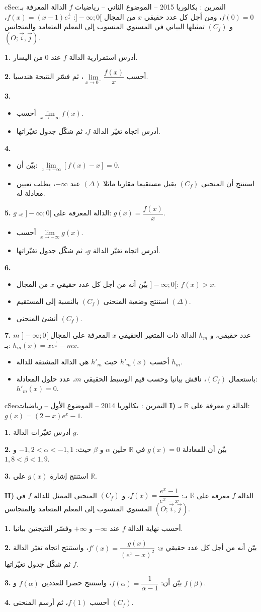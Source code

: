 \documentclass[12pt,a4paper]{article}
\newenvironment{BOX}[2]{\begin{otherlanguage}{english}\begin{arbox}{#1}{#2}}{\end{arbox}\end{otherlanguage}}
\newcounter{exo}
\newenvironment{tamrin}[1]{\stepcounter{exo}\begin{BOX}{cSec}{التمرين \theexo: #1}}{\end{BOX}}
\newcommand{\R}{\mathbb{R}}
\newenvironment{sq}{\begin{itemize}[leftmargin=2.4em,itemsep=3pt]}{\end{itemize}}
\newcommand{\qa}{\item[(أ)]}\newcommand{\qb}{\item[(ب)]}\newcommand{\qc}{\item[(جـ)]}\newcommand{\qd}{\item[(د)]}\newcommand{\qe}{\item[(هـ)]}
\newcommand{\QQ}[1]{\par\smallskip\textbf{#1.} }
\begin{document}
\begin{tamrin}{بكالوريا 2015 -- الموضوع الثاني -- رياضيات}
$f$ الدالة المعرفة بـ: $f(0)=0$، ومن أجل كل عدد حقيقي $x$ من المجال $]{-}\infty;0[$: $f(x)=(x-1)e^{\frac1x}$،
و $(C_f)$ تمثيلها البياني في المستوي المنسوب إلى المعلم المتعامد والمتجانس $(O;\vec i,\vec j)$.
\QQ{1} أدرس استمرارية الدالة $f$ عند $0$ من اليسار.
\QQ{2} أحسب $\lim\limits_{x\to0^-}\dfrac{f(x)}{x}$، ثم فسّر النتيجة هندسيا.
\QQ{3}
\begin{sq}
\qa أحسب $\lim\limits_{x\to-\infty}f(x)$.
\qb أدرس اتجاه تغيّر الدالة $f$، ثم شكّل جدول تغيّراتها.
\end{sq}
\QQ{4}
\begin{sq}
\qa بيّن أن: $\lim\limits_{x\to-\infty}\left[f(x)-x\right]=0$.
\qb استنتج أن المنحنى $(C_f)$ يقبل مستقيما مقاربا مائلا $(\Delta)$ عند $-\infty$، يطلب تعيين معادلة له.
\end{sq}
\QQ{5} $g$ الدالة المعرفة على $]{-}\infty;0[$ بـ: $g(x)=\dfrac{f(x)}{x}$.
\begin{sq}
\qa أحسب $\lim\limits_{x\to-\infty}g(x)$.
\qb أدرس اتجاه تغيّر الدالة $g$، ثم شكّل جدول تغيّراتها.
\end{sq}
\QQ{6}
\begin{sq}
\qa بيّن أنه من أجل كل عدد حقيقي $x$ من المجال $]{-}\infty;0[$: $f(x)>x$.
\qb استنتج وضعية المنحنى $(C_f)$ بالنسبة إلى المستقيم $(\Delta)$.
\qc أنشئ المنحنى $(C_f)$.
\end{sq}
\QQ{7} $m$ عدد حقيقي، و $h_m$ الدالة ذات المتغير الحقيقي $x$ المعرفة على المجال $]{-}\infty;0[$ بـ: $h_m(x)=xe^{\frac1x}-mx$.
\begin{sq}
\qa أحسب $h'_m(x)$ حيث $h'_m$ هي الدالة المشتقة للدالة $h_m$.
\qb باستعمال $(C_f)$، ناقش بيانيا وحسب قيم الوسيط الحقيقي $m$، عدد حلول المعادلة: $h'_m(x)=0$.
\end{sq}
\end{tamrin}

\begin{tamrin}{بكالوريا 2014 -- الموضوع الأول -- رياضيات}
\textbf{I)} الدالة $g$ معرفة على $\R$ بـ: $g(x)=(2-x)e^{x}-1$.
\QQ{1} أدرس تغيّرات الدالة $g$.
\QQ{2} بيّن أن للمعادلة $g(x)=0$ في $\R$ حلين $\alpha$ و $\beta$ حيث: $-1{,}2<\alpha<-1{,}1$ و $1{,}8<\beta<1{,}9$.
\QQ{3} استنتج إشارة $g(x)$ على $\R$.

\textbf{II)} الدالة $f$ معرفة على $\R$ بـ: $f(x)=\dfrac{e^{x}-1}{e^{x}-x}$،
و $(C_f)$ المنحنى الممثل للدالة $f$ في المستوي المنسوب إلى المعلم المتعامد والمتجانس $(O;\vec i,\vec j)$.
\QQ{1} أحسب نهاية الدالة $f$ عند $-\infty$ و $+\infty$ وفسّر النتيجتين بيانيا.
\QQ{2} بيّن أنه من أجل كل عدد حقيقي $x$: $f'(x)=\dfrac{g(x)}{(e^{x}-x)^2}$، واستنتج اتجاه تغيّر الدالة $f$ ثم شكّل جدول تغيّراتها.
\QQ{3} بيّن أن: $f(\alpha)=\dfrac{1}{\alpha-1}$، واستنتج حصرا للعددين $f(\alpha)$ و $f(\beta)$.
\QQ{4} أحسب $f(1)$، ثم أرسم المنحنى $(C_f)$.
\end{tamrin}
\end{document}
